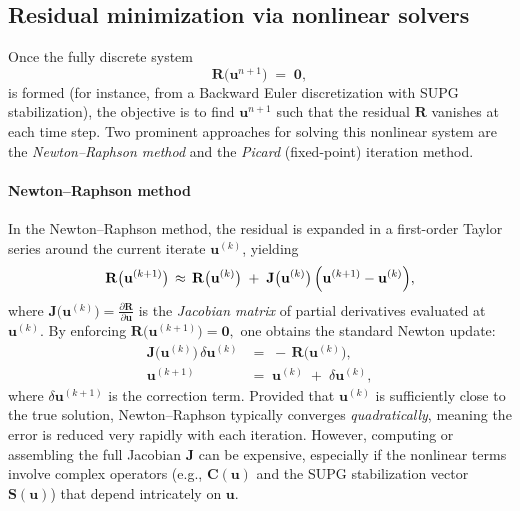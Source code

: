 \subsection{Residual minimization via nonlinear solvers}

Once the fully discrete system 
\begin{equation}
\mathbf{R}\bigl(\mathbf{u}^{n+1}\bigr) 
\;=\;
\boldsymbol{0},
\label{eq:residual_fem}
\end{equation}
is formed (for instance, from a Backward Euler discretization with SUPG stabilization), the objective is to find \(\mathbf{u}^{n+1}\) such that the residual \(\mathbf{R}\) vanishes at each time step. Two prominent approaches for solving this nonlinear system are the \textit{Newton--Raphson method} and the \textit{Picard} (fixed-point) iteration method.

\paragraph{Newton--Raphson method}

In the Newton--Raphson method, the residual is expanded in a first-order Taylor series around the current iterate \(\mathbf{u}^{(k)}\), yielding
\begin{equation}
\mathbf{R}\bigl(\mathbf{u}^{(k+1)}\bigr)
\,\approx\,
\mathbf{R}\bigl(\mathbf{u}^{(k)}\bigr)
\;+\;
\mathbf{J}\bigl(\mathbf{u}^{(k)}\bigr)\,
\Bigl(\mathbf{u}^{(k+1)} - \mathbf{u}^{(k)}\Bigr),
\end{equation}
where \(\mathbf{J}\bigl(\mathbf{u}^{(k)}\bigr) = \tfrac{\partial \mathbf{R}}{\partial \mathbf{u}}\) is the \textit{Jacobian matrix} of partial derivatives evaluated at \(\mathbf{u}^{(k)}\). By enforcing
\(\mathbf{R}\bigl(\mathbf{u}^{(k+1)}\bigr)=\boldsymbol{0},\) one obtains the standard Newton update:
\begin{subequations}
\begin{align}
\mathbf{J}\bigl(\mathbf{u}^{(k)}\bigr)\,\delta \mathbf{u}^{(k)} 
&=\;
-\,\mathbf{R}\bigl(\mathbf{u}^{(k)}\bigr),\\
\mathbf{u}^{(k+1)} 
&=\;
\mathbf{u}^{(k)}
\;+\;
\delta \mathbf{u}^{(k)},
\end{align}
\end{subequations}
where \(\delta \mathbf{u}^{(k+1)}\) is the correction term. Provided that \(\mathbf{u}^{(k)}\) is sufficiently close to the true solution, Newton--Raphson typically converges \textit{quadratically}, meaning the error is reduced very rapidly with each iteration. However, computing or assembling the full Jacobian \(\mathbf{J}\) can be expensive, especially if the nonlinear terms involve complex operators (e.g., \(\mathbf{C}(\mathbf{u})\) and the SUPG stabilization vector \(\mathbf{S}(\mathbf{u})\)) that depend intricately on \(\mathbf{u}\).


